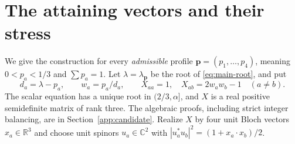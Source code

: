 \section{The attaining vectors and their stress}\label{sec:construction}
We give the construction for every \emph{admissible} profile
$\boldsymbol p=(p_1,\ldots,p_4)$, meaning $0<p_a<1/3$ and $\sum p_a=1$.
Let $\lambda=\lambda_{\boldsymbol p}$ be the root of
\eqref{eq:main-root}, and put
\begin{equation}\label{eq:construction-data}
 d_a=\lambda-p_a,\qquad w_a=p_a/d_a,\qquad
 X_{aa}=1,\quad X_{ab}=2w_aw_b-1\quad(a\ne b).
\end{equation}
The scalar equation has a unique root in $(2/3,\alpha]$, and $X$ is a
real positive semidefinite matrix of rank three. The algebraic proofs,
including strict integer balancing, are in Section~\ref{app:candidate}.
Realize $X$ by four unit Bloch vectors $x_a\in\mathbb R^3$ and choose
unit spinors $u_a\in\mathbb C^2$ with
$|u_a^*u_b|^2=(1+x_a\cdot x_b)/2$.

